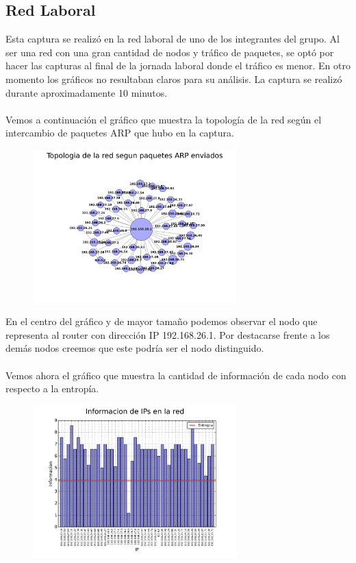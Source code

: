 \subsection{Red Laboral}

Esta captura se realizó en la red laboral de uno de los integrantes del grupo. Al ser una red con una gran cantidad de nodos y tráfico de paquetes, se optó por hacer las capturas al final de la jornada laboral donde el tráfico es menor. En otro momento los gráficos no resultaban claros para su análisis. La captura se realizó durante aproximadamente 10 minutos.
\\\\
Vemos a continuación el gráfico que muestra la topología de la red según el intercambio de paquetes ARP que hubo en la captura.

\begin{figure}[ht!]
  \centering
   \includegraphics[width=0.7\textwidth]{graficos/laboral_network.png}
  \caption{}
  \label{fig:laboral_network}
\end{figure}

En el centro del gráfico y de mayor tamaño podemos observar el nodo que representa al router con dirección IP 192.168.26.1. Por destacarse frente a los demás nodos creemos que este podría ser el nodo distinguido.
\\\\
Vemos ahora el gráfico que muestra la cantidad de información de cada nodo con respecto a la entropía.

\begin{figure}[ht!]
  \centering
   \includegraphics[width=0.7\textwidth]{graficos/laboral_information_bars_arp.png}
  \caption{}
  \label{fig:laboral_information_bars_arp}
\end{figure}

